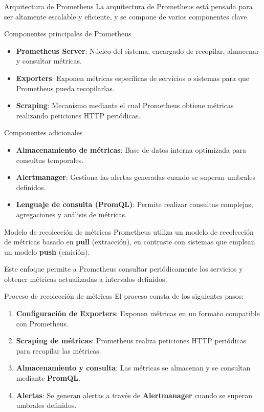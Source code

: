 \documentclass{beamer}
\begin{document}
\begin{frame}{Arquitectura de Prometheus}
La arquitectura de Prometheus está pensada para ser altamente escalable y eficiente, y se compone de varios componentes clave.
\end{frame}

\begin{frame}{Componentes principales de Prometheus}
\begin{itemize}
  \item \textbf{Prometheus Server}: Núcleo del sistema, encargado de recopilar, almacenar y consultar métricas.
  \item \textbf{Exporters}: Exponen métricas específicas de servicios o sistemas para que Prometheus pueda recopilarlas.
  \item \textbf{Scraping}: Mecanismo mediante el cual Prometheus obtiene métricas realizando peticiones HTTP periódicas.
\end{itemize}
\end{frame}

\begin{frame}{Componentes adicionales}
\begin{itemize}
  \item \textbf{Almacenamiento de métricas}: Base de datos interna optimizada para consultas temporales.
  \item \textbf{Alertmanager}: Gestiona las alertas generadas cuando se superan umbrales definidos.
  \item \textbf{Lenguaje de consulta (PromQL)}: Permite realizar consultas complejas, agregaciones y análisis de métricas.
\end{itemize}
\end{frame}

\begin{frame}{Modelo de recolección de métricas}
Prometheus utiliza un modelo de recolección de métricas basado en \textbf{pull} (extracción), en contraste con sistemas que emplean un modelo \textbf{push} (emisión).

Este enfoque permite a Prometheus consultar periódicamente los servicios y obtener métricas actualizadas a intervalos definidos.
\end{frame}

\begin{frame}{Proceso de recolección de métricas}
El proceso consta de los siguientes pasos:
\begin{enumerate}
  \item \textbf{Configuración de Exporters}: Exponen métricas en un formato compatible con Prometheus.
  \item \textbf{Scraping de métricas}: Prometheus realiza peticiones HTTP periódicas para recopilar las métricas.
  \item \textbf{Almacenamiento y consulta}: Las métricas se almacenan y se consultan mediante \textbf{PromQL}.
  \item \textbf{Alertas}: Se generan alertas a través de \textbf{Alertmanager} cuando se superan umbrales definidos.
\end{enumerate}
\end{frame}
\end{document}
